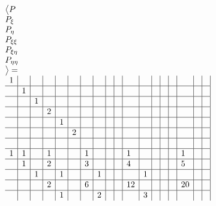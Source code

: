 \documentclass{report}
\begin{document}
\begin{equation}
\begin{array}{l}
\bigl \langle
P\\
P_\xi\\
P_\eta\\
P_{\xi\xi}\\
P_{\xi\eta}\\
P_{\eta\eta}\\
\bigr \rangle
= \\
\begin{array}{l|l|l|l|l|l|l|l|l|l|l|l|l|l|l|l|l|l|l}
 1    &     &     &     &     &     &     &     &     &     &     &     &     &     &     &     &     & \\
\hline
      &1    &     &     &     &     &     &     &     &     &     &     &     &     &     &     &     & \\
\hline
      &     &1    &     &     &     &     &     &     &     &     &     &     &     &     &     &     & \\
\hline
      &     &     &2    &     &     &     &     &     &     &     &     &     &     &     &     &     & \\
\hline
      &     &     &     &1    &     &     &     &     &     &     &     &     &     &     &     &     & \\
\hline
      &     &     &     &     &2    &     &     &     &     &     &     &     &     &     &     &     & \\
\hline
      &     &     &     &     &     &     &     &     &     &     &     &     &     &     &     &     & \\
\hline
 1    &1    &     &1    &     &     &1    &     &     &     &1    &     &     &     &     &1    &     & \\
\hline
      &1    &     &2    &     &     &3    &     &     &     &4    &     &     &     &     &5    &     & \\
\hline
      &     &1    &     &1    &     &     &1    &     &     &     &1    &     &     &     &     &     & \\
\hline
      &     &     &2    &     &     &6    &     &     &     &12   &     &     &     &     &20   &     & \\
\hline
      &     &     &     &1    &     &     &2    &     &     &     &3    &     &     &     &     &     & \\

\end{array}
\end{array}
\end{equation}
\end{document}
